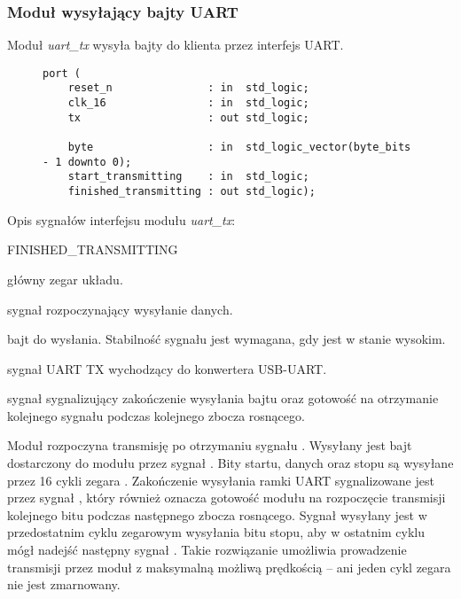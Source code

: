 \subsubsection{Moduł wysyłający bajty UART}
Moduł \textit{uart\_tx} wysyła bajty do klienta przez interfejs UART.

\begin{figure}[!h]
\begin{lstlisting}[style=vhdl, captionpos=b, caption={\textit{uart\_tx} -- interfejs modułu}]
port (
	reset_n               : in  std_logic;
	clk_16                : in  std_logic;
	tx                    : out std_logic;

	byte                  : in  std_logic_vector(byte_bits - 1 downto 0);
	start_transmitting    : in  std_logic;
	finished_transmitting : out std_logic);
\end{lstlisting}
\end{figure}

Opis sygnałów interfejsu modułu \textit{uart\_tx}:
\begin{interface}{FINISHED\_TRANSMITTING}
\item[\insignal{CLK\_16}] główny zegar układu.
\item[\insignal{START\_TRANSMITTING}] sygnał rozpoczynający wysyłanie danych.
\item[\insignal{BYTE[7:0]}] bajt do wysłania. Stabilność sygnału jest wymagana, gdy  jest w stanie wysokim.
\item[\outsignal{TX}] sygnał UART TX wychodzący do konwertera USB-UART.
\item[\outsignal{FINISHED\_TRANSMITTING}] sygnał sygnalizujący zakończenie wysyłania bajtu oraz gotowość na otrzymanie kolejnego sygnału  podczas kolejnego zbocza rosnącego.
\end{interface}

Moduł rozpoczyna transmisję po otrzymaniu sygnału . Wysyłany jest bajt dostarczony do modułu przez sygnał . Bity startu, danych oraz stopu są wysyłane przez 16 cykli zegara . Zakończenie wysyłania ramki UART sygnalizowane jest przez sygnał , który również oznacza gotowość modułu na rozpoczęcie transmisji kolejnego bitu podczas następnego zbocza rosnącego. Sygnał  wysyłany jest w przedostatnim cyklu zegarowym wysyłania bitu stopu, aby w ostatnim cyklu mógł nadejść następny sygnał . Takie rozwiązanie umożliwia prowadzenie transmisji przez moduł z maksymalną możliwą prędkością -- ani jeden cykl zegara nie jest zmarnowany.

